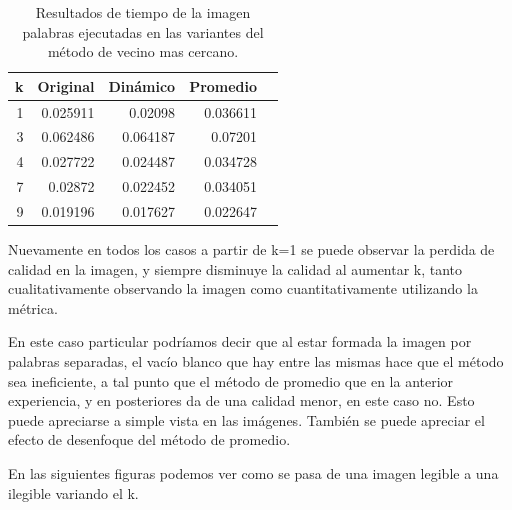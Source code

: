 \documentclass[a4paper]{article}
\newcounter{col}
\begin{document}
\begin{table}[H]
\centering
\begin{tabular}{|r|r|r|r|r|}
\hline
\multicolumn{1}{|c|}{k} & \multicolumn{1}{c|}{Original} & \multicolumn{1}{c|}{Dinámico} & \multicolumn{1}{c|}{Promedio} \\ \hline
1 &0.025911 & 0.02098 & 0.036611 \\ \hline
3 & 0.062486 & 0.064187 & 0.07201 \\ \hline
4 & 0.027722 &  0.024487 & 0.034728 \\ \hline
7 & 0.02872&  0.022452 & 0.034051 \\ \hline
9 &0.019196& 0.017627 & 0.022647 \\ \hline
\end{tabular}
\caption{Resultados de tiempo de la imagen palabras ejecutadas en las variantes del m\'etodo de vecino mas cercano.}
\label{}
\end{table}

Nuevamente en todos los casos a partir de k=1 se puede observar la perdida de calidad en la imagen, y siempre disminuye la calidad al aumentar k, tanto cualitativamente observando la imagen como cuantitativamente utilizando la métrica. 

En este caso particular podríamos decir que al estar formada la imagen por palabras separadas, el vacío blanco que hay entre las mismas hace que el método sea ineficiente, a tal punto que el método de promedio que en la anterior experiencia, y en posteriores da de una calidad menor, en este caso no. Esto puede apreciarse a simple vista en las imágenes. También se puede apreciar el efecto de desenfoque del método de promedio.


En las siguientes figuras podemos ver como se pasa de una imagen legible a una ilegible variando el k.
\end{document}
